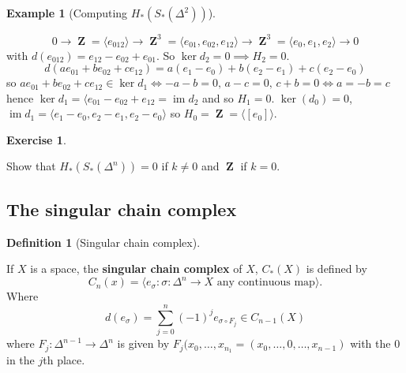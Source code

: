 \documentclass[10pt,]{book}
\newcommand{\terminology}[1]{\textbf{#1}}
\theoremstyle{plain}
\theoremstyle{definition}
\newtheorem{definition}[theorem]{Definition}
\newtheorem{example}[theorem]{Example}
\newtheorem{exercise}[theorem]{Exercise}
\numberwithin{equation}{section}
\DeclareMathOperator{\im}{im}
\DeclareMathOperator{\ZZ}{\mathbf{Z}}
\begin{document}
\begin{example}[Computing \(H_*(S_*(\Delta^2))\)]\label{example-6}

              \[
                0\to \ZZ = \langle e_{012}\rangle \to \ZZ^3 = \langle e_{01}, e_{02},e_{12}\rangle \to \ZZ^3 = \langle e_0,e_1,e_2 \rangle \to 0
              \]
              with \(d(e_{012}) = e_{12} - e_{02} + e_{01}\).
              So \(\ker d_2 = 0 \implies H_2 = 0\).
              \[
                d(ae_{01} + be_{02} + ce_{12}) = a(e_1 - e_0) + b (e_2 - e_1)  + c(e_2 - e_0)
              \]
              so \(ae_{01} + be_{02} + ce_{12}\in \ker d_1 \iff -a-b=0,\,a-c = 0,\, c+b = 0 \iff a = -b = c\) hence \(\ker d_1 = \langle e_{01} - e_{02} + e_{12} = \im d_2\) and so \(H_1 = 0\).
              \(\ker(d_0) = 0\), \(\im d_1 = \langle e_1 - e_0, e_2 - e_1, e_2 - e_0\rangle\) so \(H_0 = \ZZ = \langle [e_0]\rangle\).
\end{example}
\begin{exercise}\label{exercise-2}

              Show that \(H_*(S_*(\Delta^n)) = 0\) if \(k \ne 0\) and \(\ZZ\) if \(k = 0\).
            \end{exercise}
\typeout{************************************************}
\typeout{************************************************}
\subsection[The singular chain complex]{The singular chain complex}\label{subsection-5}
\begin{definition}[Singular chain complex]\label{definition-10}

              If \(X\) is a space, the \terminology{singular chain complex} of \(X\), \(C_*(X)\) is defined by
              \[C_n(x) = \langle e_\sigma : \sigma \colon \Delta^n \to X \text{ any continuous map}\rangle.\]
              Where 
              \[d(e_\sigma) = \sum_{j=0}^{n} (-1)^j e_{\sigma\circ F_j} \in C_{n-1}(X)\]
              where \(F_j\colon \Delta^{n-1} \to \Delta^n\) is given by \(F_j(x_0,\ldots,x_{n_1} = (x_0,\ldots,0,\ldots,x_{n-1})\) with the \(0\) in the \(j\)th place.
            \end{definition}
\typeout{************************************************}
\typeout{************************************************}
\end{document}
